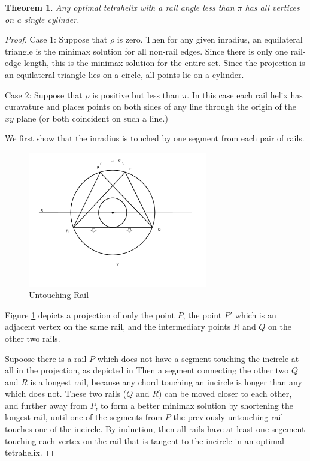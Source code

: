 \documentclass[11pt]{article}
\newtheorem{theorem}{Theorem}
\begin{document}
\begin{theorem}
  \label{thm:cylinder}
  Any optimal tetrahelix with a rail angle less than $\pi$ has all vertices on a single cylinder.
\end{theorem}

\begin{proof}

Case 1: Suppose that $\rho$ is zero. Then for any given inradius, an equilateral
triangle is the minimax solution for all non-rail edges. Since there is only
one rail-edge length, this is the minimax solution for the entire set. Since
the projection is an equilateral triangle lies on a circle, all points lie on
a cylinder.

Case 2: Suppose that $\rho$ is positive but less than $\pi$.
In this case each rail helix has
curavature and places points on both sides of any line through the origin
of the $xy$ plane (or both coincident on such a line.)

We first show that the inradius is touched by one segment from each pair
of rails.

\begin{figure}[H]
  \label{untouchingrailfig}
     \centering
     \includegraphics[width=0.7\textwidth]{figures/UntouchingRail.png}
     \caption{Untouching Rail}
\end{figure}

Figure \ref{untouchingrailfig} depicts a projection of
only the point $P$, the point $P'$ which is an adjacent vertex on the same rail,
and the intermediary points $R$ and $Q$ on the other two rails.

Supoose there is a rail $P$ which does not have a segment touching the incircle
at all in the projection, as depicted in 
Then a segment connecting the other two $Q$ and $R$ is a longest
rail, because any chord touching an incircle is longer than any which does not.
These two rails ($Q$ and $R$) can be moved closer to each other, and further away from $P$, to form a better minimax solution
by shortening the longest rail, until one of the segments from $P$ the previously
untouching rail touches one of the incircle. By induction, then all rails have
at least one segement touching each vertex on the rail that is tangent to the
incircle in an optimal tetrahelix.


\end{proof}
\end{document}
